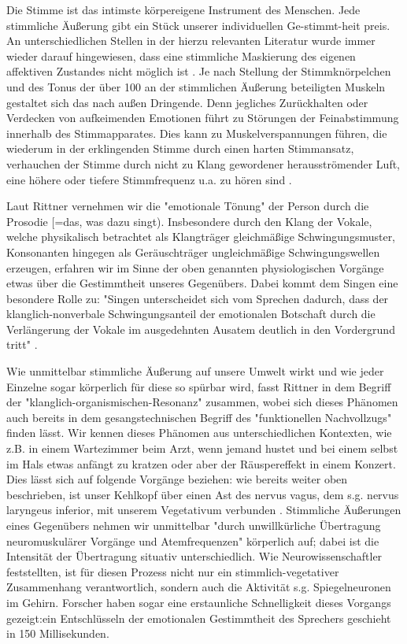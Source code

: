 Die Stimme ist das intimste körpereigene Instrument des Menschen. Jede stimmliche Äußerung gibt ein Stück unserer individuellen Ge-stimmt-heit preis. An unterschiedlichen Stellen in der hierzu relevanten Literatur wurde immer wieder darauf hingewiesen, dass eine stimmliche Maskierung des eigenen affektiven Zustandes nicht möglich ist \autocite[vgl.][279]{decker-voigt1992} \autocite[vgl.][481]{rittner2009a}. Je nach Stellung der Stimmknörpelchen und des Tonus der über 100 an der stimmlichen Äußerung beteiligten Muskeln \autocite[vgl.][40]{cramer1998} gestaltet sich das nach außen Dringende. Denn jegliches Zurückhalten oder Verdecken von aufkeimenden Emotionen führt zu Störungen der Feinabstimmung innerhalb des Stimmapparates. Dies kann zu Muskelverspannungen führen, die wiederum in der erklingenden Stimme durch einen harten Stimmansatz, verhauchen der Stimme durch nicht zu Klang gewordener herausströmender Luft, eine höhere oder tiefere Stimmfrequenz u.a. zu hören sind \autocite[vgl.][279]{decker-voigt1992}. 

Laut Rittner vernehmen wir die "emotionale Tönung" der Person durch die Prosodie [=das, was dazu singt). Insbesondere durch den Klang der Vokale, welche physikalisch betrachtet als Klangträger gleichmäßige Schwingungsmuster, Konsonanten hingegen als Geräuschträger ungleichmäßige Schwingungswellen erzeugen, erfahren wir im Sinne der oben genannten physiologischen Vorgänge etwas über die Gestimmtheit unseres Gegenübers. Dabei kommt dem Singen eine besondere Rolle zu: "Singen unterscheidet sich vom Sprechen dadurch, dass der klanglich-nonverbale Schwingungsanteil der emotionalen Botschaft durch die Verlängerung der Vokale im ausgedehnten Ausatem deutlich in den Vordergrund tritt" \autocite[205]{rittner2008}.

Wie unmittelbar stimmliche Äußerung auf unsere Umwelt wirkt und wie jeder Einzelne sogar körperlich für diese so spürbar wird, fasst Rittner in dem Begriff der "klanglich-organismischen-Resonanz" zusammen, wobei sich dieses Phänomen auch bereits in dem gesangstechnischen Begriff des "funktionellen Nachvollzugs" finden lässt. Wir kennen dieses Phänomen aus unterschiedlichen Kontexten, wie z.B. in einem Wartezimmer beim Arzt, wenn jemand hustet und bei einem selbst im Hals etwas anfängt zu kratzen oder aber der Räuspereffekt in einem Konzert. Dies lässt sich auf folgende Vorgänge beziehen: wie bereits weiter oben beschrieben, ist unser Kehlkopf über einen Ast des nervus vagus, dem s.g. nervus laryngeus inferior, mit unserem Vegetativum verbunden \autocite[vgl.][106]{rittner1990}. Stimmliche Äußerungen eines Gegenübers nehmen wir unmittelbar "durch unwillkürliche Übertragung neuromuskulärer Vorgänge und Atemfrequenzen" \autocite[482]{rittner2009a} körperlich auf; dabei ist die Intensität der Übertragung situativ unterschiedlich. Wie Neurowissenschaftler feststellten, ist für diesen Prozess nicht nur ein stimmlich-vegetativer Zusammenhang verantwortlich, sondern auch die Aktivität s.g. Spiegelneuronen im Gehirn. Forscher haben sogar eine erstaunliche Schnelligkeit dieses Vorgangs gezeigt:ein Entschlüsseln der emotionalen Gestimmtheit des Sprechers geschieht in 150 Millisekunden\autocite[vgl.][482]{rittner2009a}.

